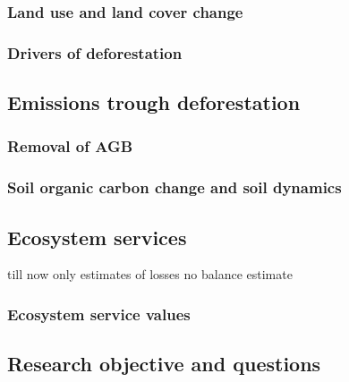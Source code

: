 	\subsubsection{Land use and land cover change}
	\subsubsection{Drivers of deforestation}
	\subsection{Emissions trough deforestation}
	\subsubsection{Removal of AGB}
	\subsubsection{Soil organic carbon change and soil dynamics}

\subsection{Ecosystem services}
	{\color{red} till now only estimates of losses no balance estimate} 
	\subsubsection{Ecosystem service values}
	\subsection{Research objective and questions}
